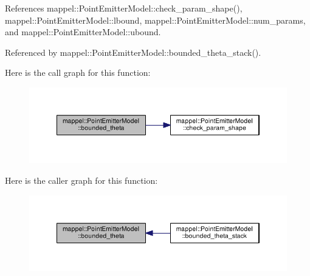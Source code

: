 References mappel\+::\+Point\+Emitter\+Model\+::check\+\_\+param\+\_\+shape(), mappel\+::\+Point\+Emitter\+Model\+::lbound, mappel\+::\+Point\+Emitter\+Model\+::num\+\_\+params, and mappel\+::\+Point\+Emitter\+Model\+::ubound.



Referenced by mappel\+::\+Point\+Emitter\+Model\+::bounded\+\_\+theta\+\_\+stack().



Here is the call graph for this function\+:\nopagebreak
\begin{figure}[H]
\begin{center}
\leavevmode
\includegraphics[width=350pt]{classmappel_1_1PointEmitterModel_ac342b21db8970dfa0b2809ffe5e73d06_cgraph}
\end{center}
\end{figure}




Here is the caller graph for this function\+:\nopagebreak
\begin{figure}[H]
\begin{center}
\leavevmode
\includegraphics[width=350pt]{classmappel_1_1PointEmitterModel_ac342b21db8970dfa0b2809ffe5e73d06_icgraph}
\end{center}
\end{figure}


